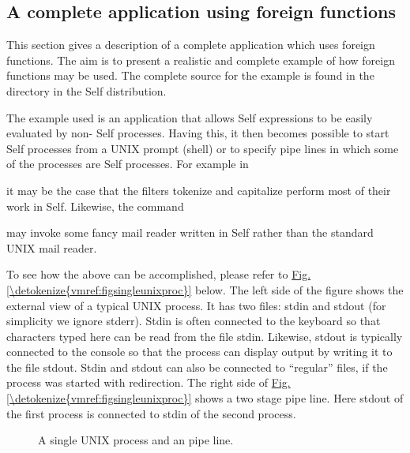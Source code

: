 \documentclass[letterpaper,10pt,english]{sphinxmanual}
\begin{document}
\begin{enumerate}
\end{enumerate}


\subsection{A complete application using foreign functions}
\label{\detokenize{vmref:a-complete-application-using-foreign-functions}}
This section gives a description of a complete application which uses foreign functions. The aim is
to present a realistic and complete example of how foreign functions may be used. The complete
source for the example is found in the directory  in the
Self distribution.

The example used is an application that allows Self expressions to be easily evaluated by non-
Self processes. Having this, it then becomes possible to start Self processes from a UNIX
prompt (shell) or to specify pipe lines in which some of the processes are Self processes. For example
in

\begin{sphinxVerbatim}[commandchars=\\\{\}]
            
\end{sphinxVerbatim}

it may be the case that the filters tokenize and capitalize perform most of their work in Self.
Likewise, the command

\begin{sphinxVerbatim}[commandchars=\\\{\}]
 
\end{sphinxVerbatim}

may invoke some fancy mail reader written in Self rather than the standard UNIX mail reader.

To see how the above can be accomplished, please refer to \hyperref[\detokenize{vmref:figsingleunixproc}]{Fig.\@ \ref{\detokenize{vmref:figsingleunixproc}}} below. The left side of the figure
shows the external view of a typical UNIX process. It has two files: stdin and stdout (for simplicity
we ignore stderr). Stdin is often connected to the keyboard so that characters typed here can
be read from the file stdin. Likewise, stdout is typically connected to the console so that the process
can display output by writing it to the file stdout. Stdin and stdout can also be connected to “regular”
files, if the process was started with redirection. The right side of \hyperref[\detokenize{vmref:figsingleunixproc}]{Fig.\@ \ref{\detokenize{vmref:figsingleunixproc}}} shows a two stage
pipe line. Here stdout of the first process is connected to stdin of the second process.
\begin{wrapfigure}{l}{0pt}
\centering
\noindent{}
\caption{A single UNIX process and an pipe line.}\label{\detokenize{vmref:figsingleunixproc}}\label{\detokenize{vmref:id14}}\end{wrapfigure}
\end{document}
